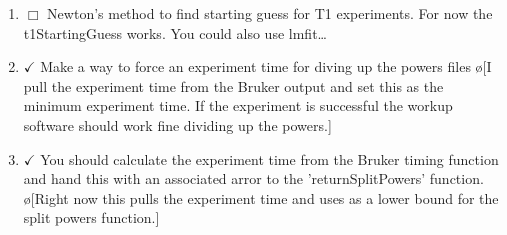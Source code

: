 \documentclass[10pt]{book}
\begin{document}
\begin{enumerate}
    \item $\Box$ Newton's method to find starting guess for T1 experiments. For now the t1StartingGuess works. You could also use lmfit\ldots
    \item $\checkmark$ Make a way to force an experiment time for diving up the powers files \o[I pull the experiment time from the Bruker output and set this as the minimum experiment time. If the experiment is successful the workup software should work fine dividing up the powers.]{}
    \item $\checkmark$ You should calculate the experiment time from the Bruker timing function and hand this with an associated arror to the 'returnSplitPowers' function. \o[Right now this pulls the experiment time and uses as a lower bound for the split powers function.]{}
\end{enumerate}
\end{document}
